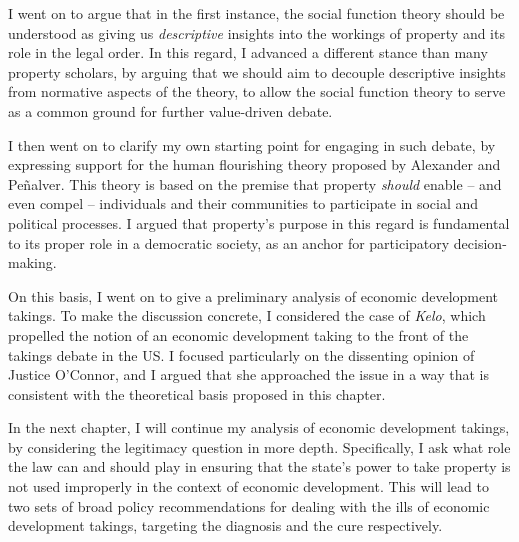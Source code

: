{I went on to argue that in the first instance, the social function theory should be understood as giving us {\it descriptive} insights into the workings of property and its role in the legal order. In this regard, I advanced a different stance than many property scholars, by arguing that we should aim to decouple descriptive insights from normative aspects of the theory, to allow the social function theory to serve as a common ground for further value-driven debate.

I then went on to clarify my own starting point for engaging in such debate, by expressing support for the human flourishing theory proposed by Alexander and Pe\~{n}alver. This theory is based on the premise that property {\it should} enable -- and even compel -- individuals and their communities to  participate in social and political processes. I argued that property's purpose in this regard is  fundamental to its proper role in a democratic society, as an anchor for participatory decision-making.  

}


On this basis, I went on to give a preliminary analysis of economic development takings. To make the discussion concrete, I considered the case of {\it Kelo}, which propelled the notion of an economic development taking to the front of the takings debate in the US. I focused particularly on the dissenting opinion of Justice O'Connor, and I argued that she approached the issue in a way that is consistent with the theoretical basis proposed in this chapter.

In the next chapter, I will continue my analysis of economic development takings, by considering the legitimacy question in more depth. Specifically, I ask what role the law can and should play in ensuring that the state's power to take property is not used improperly in the context of economic development. This will lead to two sets of broad policy recommendations for dealing with the ills of economic development takings, targeting the diagnosis and the cure respectively. %


